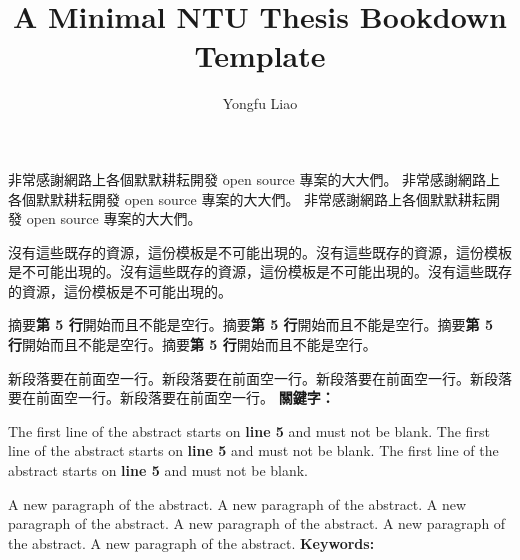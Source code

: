 \documentclass[oneside]{ntuthesis}
\institute{Department of Psychology}{心理學系}
\title{A Minimal NTU Thesis Bookdown Template}{臺灣大學論文 Bookdown 模板}
\author{Yongfu Liao}{廖永賦}
\begin{document}
\frontmatter

\makecover

\clearpage


\ifdefined\withcertification
  
\else
  \makecertification
\fi


  \begin{acknowledgementszh}
  非常感謝網路上各個默默耕耘開發 open source 專案的大大們。
  非常感謝網路上各個默默耕耘開發 open source 專案的大大們。
  非常感謝網路上各個默默耕耘開發 open source 專案的大大們。
  
  沒有這些既存的資源，這份模板是不可能出現的。沒有這些既存的資源，這份模板是不可能出現的。沒有這些既存的資源，這份模板是不可能出現的。沒有這些既存的資源，這份模板是不可能出現的。
  \end{acknowledgementszh}


\begin{abstractzh}
摘要\textbf{第 5 行}開始而且不能是空行。摘要\textbf{第 5
行}開始而且不能是空行。摘要\textbf{第 5
行}開始而且不能是空行。摘要\textbf{第 5 行}開始而且不能是空行。

新段落要在前面空一行。新段落要在前面空一行。新段落要在前面空一行。新段落要在前面空一行。新段落要在前面空一行。
\bigbreak
\noindent \textbf{關鍵字：}{\, \makeatletter \@keywordszh \makeatother}
\end{abstractzh}


\begin{abstracten}
The first line of the abstract starts on \textbf{line 5} and must not be
blank. The first line of the abstract starts on \textbf{line 5} and must
not be blank. The first line of the abstract starts on \textbf{line 5}
and must not be blank.

A new paragraph of the abstract. A new paragraph of the abstract. A new
paragraph of the abstract. A new paragraph of the abstract. A new
paragraph of the abstract. A new paragraph of the abstract.
\bigbreak
\noindent \textbf{Keywords:}{\, \makeatletter \@keywordsen \makeatother}
\end{abstracten}
\end{document}
